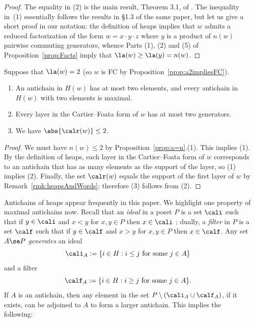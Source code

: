 \begin{proof}
    The equality in (2) is the main result, Theorem 3.1, of \cite{Shi}. The inequality in~(1) essentially follows
    the results in \S 1.3 of the same paper, but let us give a short proof in our notation: the definition of
    heaps implies that $w$ admits a reduced factorization of the form $w=x\cdot y\cdot z$ where $y$ is a product of
    $n(w)$ pairwise commuting generators, whence Parts (1), (2) and (5) of Proposition~\ref{prop:Facts} imply that
    $\la(w)\ge\la(y)=n(w)$.  
\end{proof}

\begin{corollary}
    \label{coro:layerSizeBound}
    Suppose that $\la(w)=2$ \textup{(}so $w$ is FC by Proposition~\ref{prop:a2impliesFC}\textup{)}. 
    \begin{enumerate}
        \item An antichain in $H(w)$ has at most two elements,  and every antichain in $H(w)$ with two elements is
             maximal.
        \item Every layer in the Cartier--Foata form of $w$ has at most two generators.
        \item We have $\abs{\calr(w)}\le 2$.
    \end{enumerate}
\end{corollary}
\begin{proof} 
    We must have $n(w)\le 2$ by Proposition~\ref{prop:a=n}.(1). This implies (1). By the definition of heaps, each layer in
    the Cartier--Foata form of $w$ corresponds to an antichain that has as many elements as the support of the
    layer, so (1) implies (2). Finally, the set $\calr(w)$ equals the
    support of the first layer of $w$ by Remark~\ref{rmk:heapsAndWords}; therefore (3) follows from (2).
\end{proof}

Antichains of heaps appear frequently in this paper. We highlight one property of maximal antichains now. Recall
that an \emph{ideal} in a poset $P$ is a set $\cali$ such that if $y\in \cali$ and $x<y$ for $x,y\in P$ then $x\in
\cali$ ; dually, a \emph{filter} in $P$ is a set $\calf$ such that if $y\in \calf$ and $x>y$ for $x,y\in P$ then
$x\in \calf$. Any set $A\se P$ \emph{generates} an ideal 
\[ \cali_A:=\{i\in H:i\le j\text{ for some $j\in A$}\} \]
and a filter 
\[ \calf_A:=\{i\in H:i\ge j\text{ for some $j\in A$}\}.\] 
If $A$ is an antichain, then any element in the set $P\setminus (\cali_A\cup\calf_A)$, if it exists, can be
adjoined to $A$ to form a larger antichain. This implies the following:

